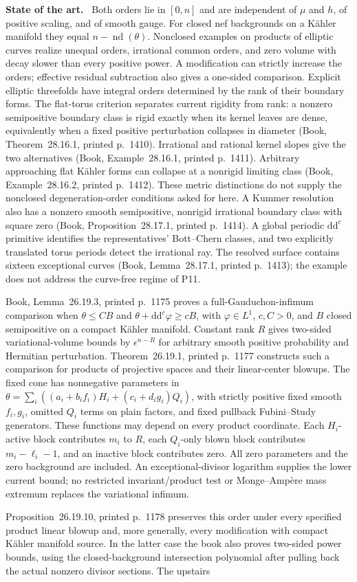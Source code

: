 \documentclass[11pt]{article}
\newcommand{\ddc}{\mathrm d\mathrm d^c}
\newcommand{\field}[1]{\par\medskip\noindent\textbf{#1.}\ }
\begin{document}
\field{State of the art} Both orders lie in $[0,n]$ and are independent of $\mu$ and $h$, of positive scaling, and of smooth gauge. For closed nef backgrounds on a K\"ahler manifold they equal $n-\operatorname{nd}(\theta)$. Nonclosed examples on products of elliptic curves realize unequal orders, irrational common orders, and zero volume with decay slower than every positive power. A modification can strictly increase the orders; effective residual subtraction also gives a one-sided comparison. Explicit elliptic threefolds have integral orders determined by the rank of their boundary forms. The flat-torus criterion separates current rigidity from rank: a nonzero semipositive boundary class is rigid exactly when its kernel leaves are dense, equivalently when a fixed positive perturbation collapses in diameter (Book, Theorem~28.16.1, printed p.~1410). Irrational and rational kernel slopes give the two alternatives (Book, Example~28.16.1, printed p.~1411). Arbitrary approaching flat K\"ahler forms can collapse at a nonrigid limiting class (Book, Example~28.16.2, printed p.~1412). These metric distinctions do not supply the nonclosed degeneration-order conditions asked for here. A Kummer resolution also has a nonzero smooth semipositive, nonrigid irrational boundary class with square zero (Book, Proposition~28.17.1, printed p.~1414). A global periodic $\ddc$ primitive identifies the representatives' Bott--Chern classes, and two explicitly translated torus periods detect the irrational ray. The resolved surface contains sixteen exceptional curves (Book, Lemma~28.17.1, printed p.~1413); the example does not address the curve-free regime of P11.\par Book, Lemma~26.19.3, printed p.~1175 proves a full-Gauduchon-infimum comparison when $\theta\leq CB$ and $\theta+\ddc\varphi\geq cB$, with $\varphi\in L^1$, $c,C>0$, and $B$ closed semipositive on a compact K\"ahler manifold. Constant rank $R$ gives two-sided variational-volume bounds by $\epsilon^{n-R}$ for arbitrary smooth positive probability and Hermitian perturbation. Theorem~26.19.1, printed p.~1177 constructs such a comparison for products of projective spaces and their linear-center blowups. The fixed cone has nonnegative parameters in $\theta=\sum_i((a_i+b_if_i)H_i+(c_i+d_ig_i)Q_i)$, with strictly positive fixed smooth $f_i,g_i$, omitted $Q_i$ terms on plain factors, and fixed pullback Fubini--Study generators. These functions may depend on every product coordinate. Each $H_i$-active block contributes $m_i$ to $R$, each $Q_i$-only blown block contributes $m_i-\ell_i-1$, and an inactive block contributes zero. All zero parameters and the zero background are included. An exceptional-divisor logarithm supplies the lower current bound; no restricted invariant/product test or Monge--Amp\`ere mass extremum replaces the variational infimum.\par Proposition~26.19.10, printed p.~1178 preserves this order under every specified product linear blowup and, more generally, every modification with compact K\"ahler manifold source. In the latter case the book also proves two-sided power bounds, using the closed-background intersection polynomial after pulling back the actual nonzero divisor sections. The upstairs 
\end{document}
